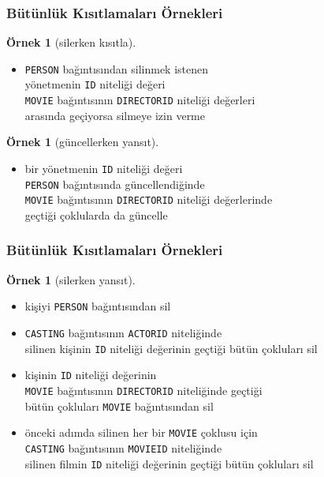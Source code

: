 \documentclass[dvipsnames]{beamer}
\theoremstyle{definition}
\theoremstyle{example}
\newtheorem{ornek}[theorem]{Örnek}
\theoremstyle{plain}
\begin{document}
\begin{frame}[fragile]
  \frametitle{Bütünlük Kısıtlamaları Örnekleri}

  \begin{ornek}[silerken kısıtla]
    \begin{itemize}
      \item \texttt{PERSON} bağıntısından silinmek istenen\\
        yönetmenin \texttt{ID} niteliği değeri\\
        \texttt{MOVIE} bağıntısının \texttt{DIRECTORID} niteliği değerleri\\
        arasında geçiyorsa silmeye izin verme
    \end{itemize}
  \end{ornek}

  \pause
  \begin{ornek}[güncellerken yansıt]
    \begin{itemize}
      \item bir yönetmenin \texttt{ID} niteliği değeri\\
        \texttt{PERSON} bağıntısında güncellendiğinde\\
        \texttt{MOVIE} bağıntısının \texttt{DIRECTORID} niteliği değerlerinde\\
        geçtiği çoklularda da güncelle
    \end{itemize}
  \end{ornek}
\end{frame}

\begin{frame}[fragile]
  \frametitle{Bütünlük Kısıtlamaları Örnekleri}

  \begin{ornek}[silerken yansıt]
    \begin{itemize}
      \item kişiyi \texttt{PERSON} bağıntısından sil

      \pause
      \item \texttt{CASTING} bağıntısının \texttt{ACTORID} niteliğinde\\
        silinen kişinin \texttt{ID} niteliği değerinin geçtiği bütün çokluları
        sil

      \pause
      \item kişinin \texttt{ID} niteliği değerinin\\
        \texttt{MOVIE} bağıntısının \texttt{DIRECTORID} niteliğinde geçtiği\\
        bütün çokluları \texttt{MOVIE} bağıntısından sil

      \pause
      \item önceki adımda silinen her bir \texttt{MOVIE} çoklusu için\\
        \texttt{CASTING} bağıntısının \texttt{MOVIEID} niteliğinde\\
        silinen filmin \texttt{ID} niteliği değerinin geçtiği bütün çokluları sil
    \end{itemize}
  \end{ornek}
\end{frame}
\end{document}
